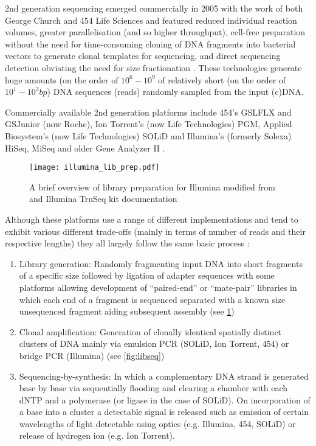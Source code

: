 2nd generation sequencing emerged commercially in 2005 with the work
of both George Church and 454 Life Sciences \citep{Margulies2005} and featured
reduced individual reaction volumes, greater parallelisation (and so higher throughput),
cell-free preparation without the need for time-consuming cloning of DNA fragments into bacterial vectors to generate
clonal templates for sequencing, and direct sequencing detection obviating the need
for size fractionation \citep{Jaszczyszyn2014}.
These technologies generate huge amounts (on the order of \(10^{6}-10^{9}\) of relatively short (on the order of \(10^{1}-10^{3}bp\)) DNA sequences 
    (reads) randomly sampled from the input (c)DNA. 


Commercially available 2nd generation platforms include 454's GSLFLX and GSJunior (now Roche),
Ion Torrent's (now Life Technologies) PGM, Applied Biosystem's (now Life Technologies) SOLiD and Illumina's (formerly Solexa) 
HiSeq, MiSeq and older Gene Analyzer II \citep{Nederbragt2012}.

\begin{figure}
    \texttt{[image: illumina\_lib\_prep.pdf]}
    \label{fig:libprep}
    \caption{A brief overview of library preparation for Illumina modified from \citep{Mardis2008} and Illumina TruSeq kit documentation} 
\end{figure}

Although these platforms use a range of different implementations and tend to exhibit various different trade-offs (mainly in terms
of number of reads and their respective lengths) they all largely follow the same basic process \citep{Shendure2008}:
\begin{enumerate}
        \item Library generation: Randomly fragmenting input DNA into short fragments of a specific size
            followed by ligation of adapter sequences with some platforms allowing development of ``paired-end'' or ``mate-pair'' libraries in which
            each end of a fragment is sequenced separated with a known size unsequenced fragment aiding subsequent assembly (see \ref{fig:libprep})
        \item Clonal amplification: Generation of clonally identical spatially distinct clusters of DNA mainly via emulsion PCR \citep{Dressman2003} (SOLiD, Ion Torrent, 454)
            or bridge PCR \citep{Adessi2000,Fedurco2006} (Illumina) (see \ref{fig:libseq})
        \item Sequencing-by-synthesis: In which a complementary DNA strand is generated base by base via sequentially flooding and clearing a
            chamber with each dNTP and a polymerase (or ligase in the case of SOLiD).  On incorporation of a base into a cluster a detectable signal is released such as emission of certain wavelengths of light 
detectable using optics (e.g. Illumina, 454, SOLiD) or release of hydrogen ion (e.g. Ion Torrent).
\end{enumerate}

